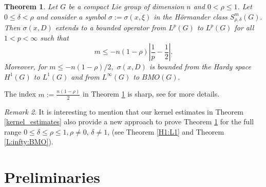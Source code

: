 \documentclass[12pt, reqno]{amsart}
\newtheorem{theorem}{Theorem}[section]
\theoremstyle{definition}
\theoremstyle{remark}
\newtheorem{remark}[theorem]{Remark}
\numberwithin{equation}{section}
\begin{document}
\begin{theorem}\label{Lp:DR}
    Let $G$ be a compact Lie group of dimension $n$ and $0<\rho\leq 1$. Let $0\leq\delta<\rho$ and consider a symbol $\sigma:=\sigma(x,\xi)$ in the H\"ormander class $S^{m}_{\rho,\delta}(G).$
    Then $\sigma(x,D)$ extends to a bounded operator from $L^p(G)$ to $L^p(G)$ for all $1<p<\infty$ such that 
    \begin{equation*}
    m\leq   -n(1-\rho)  \left|\frac{1}{p}-\frac{1}{2}\right|.
    \end{equation*}Moreover, for $m\leq -n(1-\rho)/2,$ $\sigma(x,D)$  is bounded from the Hardy space $H^1(G)$ to $L^1(G)$ and from $L^\infty(G)$ to $BMO(G).$
\end{theorem}
The index $m:=\frac{n(1-\rho)}{2}$ in Theorem \ref{Lp:DR} is sharp, see \cite[Remark 4.16]{9} for more details. 
\begin{remark} It is interesting to mention that our kernel estimates in Theorem \ref{kernel_estimates} also provide a new approach to prove Theorem \ref{Lp:DR} for the full range $0 \leq \delta \le \rho \le 1, \rho\neq0,\,\delta \neq 1$, (see Theorem \ref{H1:L1} and Theorem \ref{L:infty:BMO}).
    
\end{remark}


\section{Preliminaries}\label{Section:2}
\end{document}
